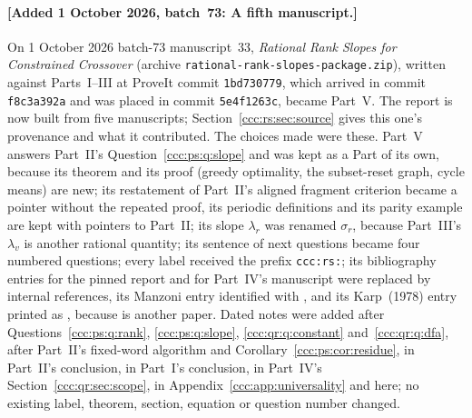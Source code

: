 \documentclass[11pt,letterpaper]{article}
\theoremstyle{definition}
\theoremstyle{remark}
\newcommand{\waddsevthree}[1]{\textup{[}Added 1 October 2026, batch~73: #1\textup{]}}
\begin{document}
\paragraph{\waddsevthree{A fifth manuscript.}} On 1 October 2026 batch-73
manuscript~33, \emph{Rational Rank Slopes for Constrained Crossover}
(archive \texttt{rational-rank-slopes-package.zip}), written against
Parts~I--III at ProveIt commit \texttt{1bd730779}, which arrived in commit
\texttt{f8c3a392a} and was placed in commit \texttt{5e4f1263c}, became
Part~V. The report is now built from five manuscripts;
Section~\ref{ccc:rs:sec:source} gives this one's provenance and what it
contributed. The choices made were these. Part~V answers Part~II's
Question~\ref{ccc:ps:q:slope} and was kept as a Part of its own, because its
theorem and its proof (greedy optimality, the subset-reset graph, cycle
means) are new; its restatement of Part~II's aligned fragment criterion
became a pointer without the repeated proof, its periodic definitions and
its parity example are kept with pointers to Part~II; its slope $\lambda_r$
was renamed $\sigma_r$, because Part~III's $\lambda_v$ is another rational
quantity; its sentence of next questions became four numbered questions;
every label received the prefix \texttt{ccc:rs:}; its bibliography entries
for the pinned report and for Part~IV's manuscript were replaced by internal
references, its Manzoni entry identified with \cite{Manzoni}, and its
Karp~(1978) entry printed as \cite{KarpCycle}, because \cite{Karp} is another
paper. Dated notes were added after Questions~\ref{ccc:ps:q:rank},
\ref{ccc:ps:q:slope}, \ref{ccc:qr:q:constant} and~\ref{ccc:qr:q:dfa}, after Part~II's fixed-word
algorithm and Corollary~\ref{ccc:ps:cor:residue}, in Part~II's conclusion,
in Part~I's conclusion, in Part~IV's Section~\ref{ccc:qr:sec:scope}, in
Appendix~\ref{ccc:app:universality} and here; no existing label, theorem,
section, equation or question number changed.
\end{document}
